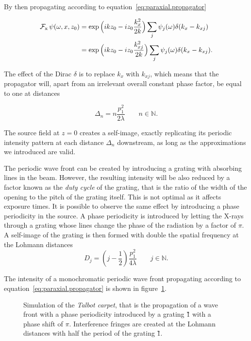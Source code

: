 By then propagating according to equation~\eqref{eq:paraxial.propagator}

\begin{align}
    \operatorname{\mathcal{F}_{x}}\psi(\omega, x, z_0) &= \exp\Big(ikz_0-i
    z_0\frac{k_x^2}{2k}\Big)\sum_j \psi_j(\omega)\delta(k_x -
    k_{xj}) \\
    &= \exp\Big(ikz_0-i z_0\frac{k_{xj}^2}{2k}\Big)\sum_j \psi_j(\omega)\delta(k_x -
    k_{xj}).
    \label{eq:talbot1}
\end{align}

The effect of the Dirac $\delta$ is to replace $k_x$ with $k_{xj}$, which
means that the propagator will, apart from an irrelevant overall constant phase
factor, be equal to one at distances

\begin{equation}
    \Delta_n = n \frac{p_1^2}{2 \lambda} \qquad n \in
    \mathbb{N}.\label{eq:talbot.distance}
\end{equation}

The source field at $z = 0$ creates a
self-image, exactly replicating its periodic intensity pattern at each
distance $\Delta_n$ downstream, as long as the approximations we introduced
are valid.

The periodic wave front can be created by introducing a grating with absorbing lines in
the beam. However, the resulting intensity will be also reduced by a factor
known as the \emph{duty cycle} of the grating, that is the ratio of the
width of the opening to the pitch of the grating itself. This is not optimal
as it affects exposure times. It is possible to observe the same effect
by introducing a phase periodicity in the source. A phase periodicity is
introduced by letting the X-rays
through a grating whose lines change the phase of the radiation by a
factor of $\pi$. A self-image of the grating is then formed with double the
spatial frequency at the Lohmann distances~\parencite{Lohmann1971}
\begin{equation}
    D_j = \left(j - \frac{1}{2}\right) \frac{p_1^2}{4 \lambda} \qquad
    j\in\mathbb{N}.\label{eq:lohmann-distance}
\end{equation}

The intensity of a monochromatic periodic wave front propagating according to
equation~\eqref{eq:paraxial.propagator} is shown in
figure~\ref{fig:talbotcarpet}.

\begin{figure}[htb]
    \centering
    
    \caption[Talbot carpet.]{Simulation of the \emph{Talbot carpet},
    that is the propagation of a wave front with a phase periodicity
    introduced by a grating \G1 with a phase shift of $\pi$.
    Interference fringes are created at the Lohmann distances with half the
period of the grating \G1.}
    \label{fig:talbotcarpet}
\end{figure}


